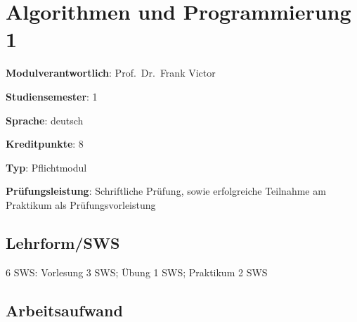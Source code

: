 \hypertarget{algorithmen-und-programmierung-1pathlabel....srcmodulbeschreibungen-bachelor-bpo5ba_algorithmenundprogrammierung1}{%
\chapter{Algorithmen und Programmierung
1\label{../../src/modulbeschreibungen-bachelor-bpo5/BA_AlgorithmenundProgrammierung1}}\label{algorithmen-und-programmierung-1pathlabel....srcmodulbeschreibungen-bachelor-bpo5ba_algorithmenundprogrammierung1}}

\begin{modulHead}
\textbf{Modulverantwortlich}: Prof.~Dr.~Frank
Victor
\end{modulHead}
\begin{modulHead}
\textbf{Studiensemester}:
1
\end{modulHead}
\begin{modulHead}
\textbf{Sprache}:
deutsch
\end{modulHead}
\begin{modulHead}
\textbf{Kreditpunkte}:
8
\end{modulHead}
\begin{modulHead}
\textbf{Typ}:
Pflichtmodul
\end{modulHead}
\begin{modulHead}
\textbf{Prüfungsleistung}:
Schriftliche Prüfung, sowie erfolgreiche Teilnahme am Praktikum als
Prüfungsvorleistung
\end{modulHead}


\hypertarget{lehrformswspathlabel....srcmodulbeschreibungen-bachelor-bpo5ba_algorithmenundprogrammierung1}{%
\section*{Lehrform/SWS\label{../../src/modulbeschreibungen-bachelor-bpo5/BA_AlgorithmenundProgrammierung1}}\label{lehrformswspathlabel....srcmodulbeschreibungen-bachelor-bpo5ba_algorithmenundprogrammierung1}}

6 SWS: Vorlesung 3 SWS; Übung 1 SWS; Praktikum 2 SWS

\hypertarget{arbeitsaufwandpathlabel....srcmodulbeschreibungen-bachelor-bpo5ba_algorithmenundprogrammierung1}{%
\section*{Arbeitsaufwand\label{../../src/modulbeschreibungen-bachelor-bpo5/BA_AlgorithmenundProgrammierung1}}\label{arbeitsaufwandpathlabel....srcmodulbeschreibungen-bachelor-bpo5ba_algorithmenundprogrammierung1}}

